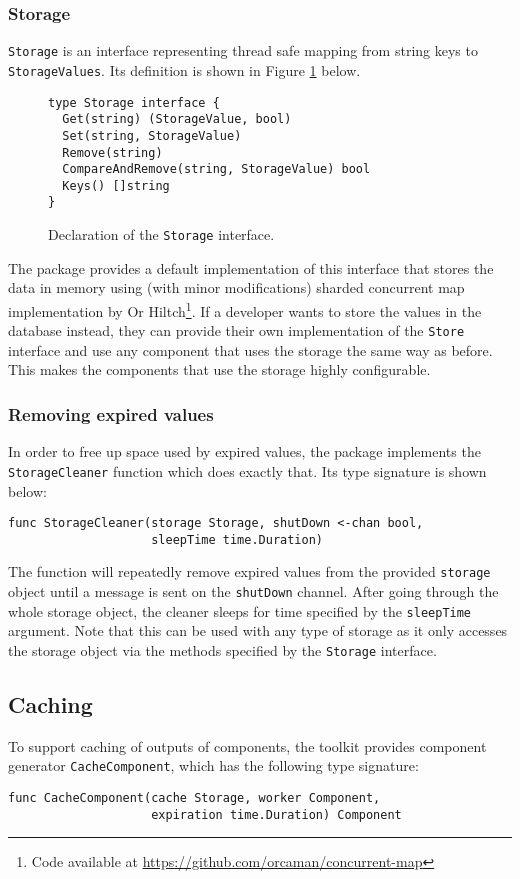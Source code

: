 \subsubsection{Storage}
\texttt{Storage} is an interface representing thread safe mapping from string keys
to \texttt{StorageValues}. Its definition is shown in Figure \ref{fig:Storage} below.
\begin{figure}[h]
\centering
\begin{lstlisting}
type Storage interface {
  Get(string) (StorageValue, bool)
  Set(string, StorageValue)
  Remove(string)
  CompareAndRemove(string, StorageValue) bool
  Keys() []string
}
\end{lstlisting}
\caption[scale=1.0]{Declaration of the \texttt{Storage} interface.}
\label{fig:Storage}
\end{figure}
The package provides a default implementation of this interface that
stores the data in memory using (with minor modifications) sharded concurrent map implementation
by Or Hiltch\footnote{Code available at \url{https://github.com/orcaman/concurrent-map}}.
If a developer wants to store the values in the 
database instead, they can provide their own implementation of the 
\texttt{Store} interface
and use any component that uses the storage the same way as before.
This makes the components that use the storage highly configurable.

\subsubsection{Removing expired values}
In order to free up space used by expired values, the package implements the
\texttt{StorageCleaner} function which does exactly that. Its type signature
is shown below:
\begin{lstlisting}
func StorageCleaner(storage Storage, shutDown <-chan bool, 
                    sleepTime time.Duration)
\end{lstlisting}
The function will repeatedly remove expired values from the provided
\texttt{storage} object until a message is sent on the \texttt{shutDown}
channel. After going through the whole storage object, the cleaner 
sleeps for time specified by the \texttt{sleepTime} argument.
Note that this can be used with any type of storage as it only accesses
the storage object via the methods specified by the \texttt{Storage} 
interface.

\subsection{Caching}
To support caching of outputs of components, the toolkit provides
component generator \texttt{CacheComponent}, which has the following type
signature:
\begin{lstlisting}
func CacheComponent(cache Storage, worker Component, 
                    expiration time.Duration) Component
\end{lstlisting}

